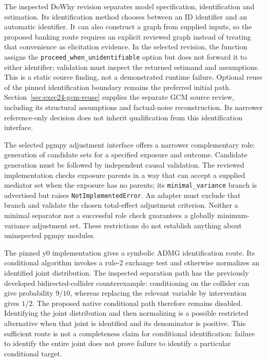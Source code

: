The inspected DoWhy revision separates model specification, identification and
estimation. Its identification method chooses between an ID identifier and an
automatic identifier. It can also construct a graph from supplied inputs, so
the proposed banking route requires an explicit reviewed graph instead of
treating that convenience as elicitation evidence. In the selected revision,
the function assigns the \texttt{proceed\_when\_unidentifiable} option but does
not forward it to either identifier; validation must inspect the returned
estimand and assumptions. This is a static source finding, not a demonstrated
runtime failure. Optional reuse of the pinned identification boundary remains
the preferred initial path. Section~\ref{sec:exec24-gcm-reuse} supplies the
separate GCM source review, including its structural assumptions and
factual-noise reconstruction. Its narrower reference-only decision does not
inherit qualification from this identification interface.
\citep{exec13_dowhy}

The selected pgmpy adjustment interface offers a narrower complementary role:
generation of candidate sets for a specified exposure and outcome. Candidate
generation must be followed by independent causal validation. The reviewed
implementation checks exposure parents in a way that can accept a supplied
mediator set when the exposure has no parents; its \texttt{minimal\_variance}
branch is advertised but raises \texttt{NotImplementedError}. An adapter must
exclude that branch and validate the chosen total-effect adjustment criterion.
Neither a minimal separator nor a successful role check guarantees a globally
minimum-variance adjustment set. These restrictions do not establish anything
about uninspected pgmpy modules.~\citep{exec13_pgmpy_reuse_primary}

The pinned y0 implementation gives a symbolic ADMG identification route.
Its conditional algorithm invokes a rule-2 exchange test and otherwise
normalizes an identified joint distribution. The inspected separation path has
the previously developed bidirected-collider counterexample: conditioning on
the collider can give probability $9/10$, whereas replacing the relevant
variable by intervention gives $1/2$. The proposed native conditional path
therefore remains disabled. Identifying the joint distribution and then
normalizing is a possible restricted alternative when that joint is identified
and its denominator is positive. This sufficient route is not a completeness
claim for conditional identification: failure to identify the entire joint
does not prove failure to identify a particular conditional target.
\citep{exec13_y0_id,exec13_y0_idc,exec13_y0_rule2,exec13_y0_separation,exec13_y0_oracles}

